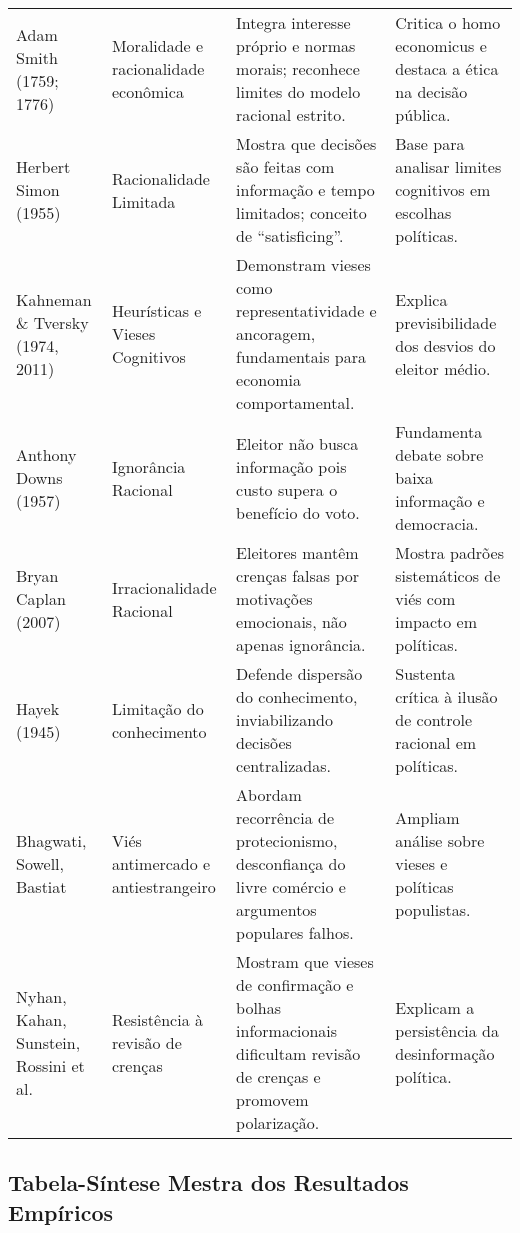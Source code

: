 \begin{apendicesenv}
\begin{quadro}[htbp]
\begin{longtable}{p{} p{} p{} p{}}
Adam Smith (1759; 1776) & Moralidade e racionalidade econômica & Integra interesse próprio e normas morais; reconhece limites do modelo racional estrito. & Critica o homo economicus e destaca a ética na decisão pública. \\
Herbert Simon (1955) & Racionalidade Limitada & Mostra que decisões são feitas com informação e tempo limitados; conceito de “satisficing”. & Base para analisar limites cognitivos em escolhas políticas. \\
Kahneman \& Tversky (1974, 2011) & Heurísticas e Vieses Cognitivos & Demonstram vieses como representatividade e ancoragem, fundamentais para economia comportamental. & Explica previsibilidade dos desvios do eleitor médio. \\
Anthony Downs (1957) & Ignorância Racional & Eleitor não busca informação pois custo supera o benefício do voto. & Fundamenta debate sobre baixa informação e democracia. \\
Bryan Caplan (2007) & Irracionalidade Racional & Eleitores mantêm crenças falsas por motivações emocionais, não apenas ignorância. & Mostra padrões sistemáticos de viés com impacto em políticas. \\
Hayek (1945) & Limitação do conhecimento & Defende dispersão do conhecimento, inviabilizando decisões centralizadas. & Sustenta crítica à ilusão de controle racional em políticas. \\
Bhagwati, Sowell, Bastiat & Viés antimercado e antiestrangeiro & Abordam recorrência de protecionismo, desconfiança do livre comércio e argumentos populares falhos. & Ampliam análise sobre vieses e políticas populistas. \\
Nyhan, Kahan, Sunstein, Rossini et al. & Resistência à revisão de crenças & Mostram que vieses de confirmação e bolhas informacionais dificultam revisão de crenças e promovem polarização. & Explicam a persistência da desinformação política. \\
\bottomrule
\end{longtable}
\end{quadro}



\begin{landscape}

\chapter{Tabela-Síntese Mestra dos Resultados Empíricos}
\label{apendice:tabela_sintese}

\begingroup
\scriptsize
\setlength{\tabcolsep}{3.5pt}


\end{landscape}
\end{apendicesenv}
